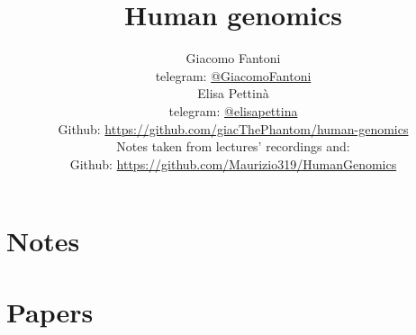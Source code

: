 

\title{\Huge\textbf{{Human genomics}}}

\author{
  Giacomo Fantoni \\
  \small telegram: \href{https://t.me/GiacomoFantoni}{@GiacomoFantoni} \\[3pt]
  Elisa Pettin\`a \\
  \small telegram: \href{https://t.me/elisapettina}{@elisapettina} \\[3pt]
  \small Github: \href{https://github.com/giacThePhantom/human-genomics}{https://github.com/giacThePhantom/human-genomics}\\
  Notes taken from lectures' recordings and:\\
  \small Github: \href{https://github.com/Maurizio319/HumanGenomics}{https://github.com/Maurizio319/HumanGenomics}
}




  \maketitle
  \tableofcontents

  \part{Notes}
    
    
    
    
    
    
    
    
    
    

  \part{Papers}
    
    
    
    
    
    
    



